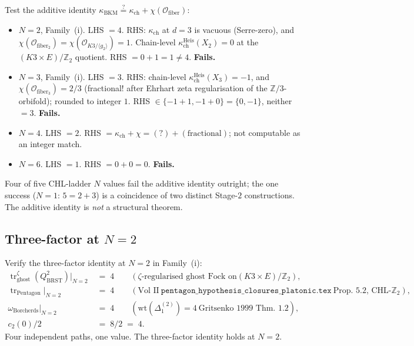 \documentclass[11pt]{article}
\theoremstyle{definition}
\newcommand{\kch}{\kappa_{\mathrm{ch}}}
\newcommand{\kBKM}{\kappa_{\mathrm{BKM}}}
\newcommand{\BRST}{\mathrm{BRST}}
\newcommand{\tr}{\operatorname{tr}}
\begin{document}
Test the additive identity $\kBKM \stackrel{?}{=} \kch + \chi(\mathcal{O}_{\mathrm{fiber}})$:

\begin{itemize}
\item $N = 2$, Family~(i). LHS $= 4$. RHS: $\kch$ at $d = 3$ is vacuous
(Serre-zero), and $\chi(\mathcal{O}_{\mathrm{fiber}_2}) =
\chi(\mathcal{O}_{K3/\langle g_2 \rangle}) = 1$. Chain-level
$\kch^{\mathrm{Heis}}(X_2) = 0$ at the $(K3 \times E)/\mathbb{Z}_2$
quotient. RHS $= 0 + 1 = 1 \neq 4$. \textbf{Fails.}

\item $N = 3$, Family~(i). LHS $= 3$. RHS: chain-level $\kch^{\mathrm{Heis}}
(X_3) = -1$, and $\chi(\mathcal{O}_{\mathrm{fiber}_3}) = 2/3$ (fractional!
after Ehrhart zeta regularisation of the $\mathbb{Z}/3$-orbifold); rounded
to integer $1$. RHS $\in \{-1 + 1, -1 + 0\} = \{0, -1\}$, neither $= 3$.
\textbf{Fails.}

\item $N = 4$. LHS $= 2$. RHS $= \kch + \chi = (?) + (\text{fractional})$;
not computable as an integer match.

\item $N = 6$. LHS $= 1$. RHS $= 0 + 0 = 0$. \textbf{Fails.}
\end{itemize}

Four of five CHL-ladder $N$ values fail the additive identity outright;
the one success ($N = 1$: $5 = 2 + 3$) is a coincidence of two distinct
Stage-$2$ constructions. The additive identity is \emph{not} a structural
theorem.

\subsection{Three-factor at $N = 2$}

Verify the three-factor identity at $N = 2$ in Family~(i):
\begin{align*}
   \tr^{\zeta}_{\mathrm{ghost}}(Q_{\BRST}^2)\bigg|_{N=2}
     &\;=\; 4 \qquad (\zeta\text{-regularised ghost Fock on}
                      (K3 \times E)/\mathbb{Z}_2), \\
   \tr_{\mathrm{Pentagon}}\bigg|_{N=2}
     &\;=\; 4 \qquad (\text{Vol II}\
                      \texttt{pentagon\_hypothesis\_closures\_platonic.tex}\
                      \text{Prop.~5.2, CHL-}\mathbb{Z}_2), \\
   \omega_{\mathrm{Borcherds}}\bigg|_{N=2}
     &\;=\; 4 \qquad (\mathrm{wt}(\Delta_1^{(2)}) = 4\
                      \text{Gritsenko 1999 Thm.~1.2}), \\
   c_2(0)/2
     &\;=\; 8/2 \;=\; 4.
\end{align*}
Four independent paths, one value. The three-factor identity holds at
$N = 2$.
\end{document}
